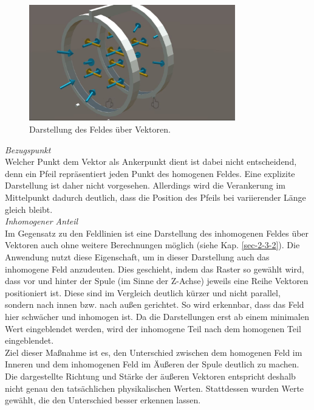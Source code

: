 \begin{figure}[h!]
	\centering
	\includegraphics[width=0.8\textwidth]{images/unity/vector.jpg}
	\caption{Darstellung des Feldes über Vektoren.}
	\label{img:mfield-vectors}
\end{figure}

\textit{Bezugspunkt}\\
Welcher Punkt dem Vektor als Ankerpunkt dient ist dabei nicht entscheidend, denn ein Pfeil repräsentiert jeden Punkt des homogenen Feldes. Eine explizite Darstellung ist daher nicht vorgesehen. Allerdings wird die Verankerung im Mittelpunkt dadurch deutlich, dass die Position des Pfeils bei variierender Länge gleich bleibt.\\

\textit{Inhomogener Anteil}\\
Im Gegensatz zu den Feldlinien ist eine Darstellung des inhomogenen Feldes über Vektoren auch ohne weitere Berechnungen möglich (siehe Kap. \ref{sec-2-3-2}). Die Anwendung nutzt diese Eigenschaft, um in dieser Darstellung auch das inhomogene Feld anzudeuten. Dies geschieht, indem das Raster so gewählt wird, dass vor und hinter der Spule (im Sinne der Z-Achse) jeweils eine Reihe Vektoren positioniert ist. Diese sind im Vergleich deutlich kürzer und nicht parallel, sondern nach innen bzw. nach außen gerichtet. So wird erkennbar, dass das Feld hier schwächer und inhomogen ist. Da die Darstellungen erst ab einem minimalen Wert eingeblendet werden, wird der inhomogene Teil nach dem homogenen Teil eingeblendet.\\
\noindent\hspace*{5mm}
Ziel dieser Maßnahme ist es, den Unterschied zwischen dem homogenen Feld im Inneren und dem inhomogenen Feld im Äußeren der Spule deutlich zu machen. Die dargestellte Richtung und Stärke der äußeren Vektoren entspricht deshalb nicht genau den tatsächlichen physikalischen Werten. Stattdessen wurden Werte gewählt, die den Unterschied besser erkennen lassen.

